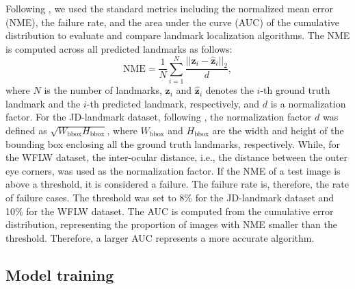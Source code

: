 \documentclass[journal]{IEEEtran}
\begin{document}
Following \cite{Wang2019c, Kumar2020, xiong2020, earp2021sub}, we used the standard metrics including the normalized mean error (NME), the failure rate, and the area under the curve (AUC) of the cumulative distribution to evaluate and compare landmark localization algorithms.
The NME is computed across all predicted landmarks as follows:
\begin{equation}
    \label{eq:nme}
    \text{NME} = \frac{1}{N} \sum_{i=1}^N \frac{||\mathbf{z}_i - \hat{\mathbf{z}}_i||_2} {d},
\end{equation}
where $N$ is the number of landmarks, $\mathbf{z}_i$ and $\hat{\mathbf{z}}_i$ denotes the $i$-th ground truth landmark and the $i$-th predicted landmark, respectively, and $d$ is a normalization factor. 
For the JD-landmark dataset, following \cite{liu2019}, the normalization factor $d$ was defined as $\sqrt{W_\text{bbox} H_\text{bbox}}$, where $W_\text{bbox}$ and $H_\text{bbox}$ are the width and height of the bounding box enclosing all the ground truth landmarks, respectively. 
While, for the WFLW dataset, the inter-ocular distance, i.e., the distance between the outer eye corners, was used as the normalization factor.
If the NME of a test image is above a threshold, it is considered a failure.
The failure rate is, therefore, the rate of failure cases. 
The threshold was set to 8\% for the JD-landmark dataset and 10\% for the WFLW dataset.
The AUC is computed from the cumulative error distribution, representing the proportion of images with NME smaller than the threshold.
Therefore, a larger AUC represents a more accurate algorithm. 



\subsection{Model training}\label{subsec:training}
\end{document}

